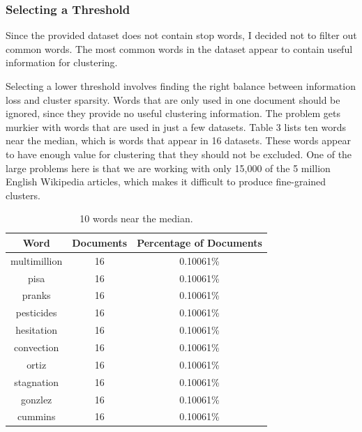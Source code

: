 \documentclass{article} %
\begin{document}
\subsubsection{Selecting a Threshold}

Since the provided dataset does not contain stop words, I decided not to filter out common words. The most common words in the dataset appear to contain useful information for clustering. 

Selecting a lower threshold involves finding the right balance between information loss and cluster sparsity. Words that are only used in one document should be ignored, since they provide no useful clustering information. The problem gets murkier with words that are used in just a few datasets. Table 3 lists ten words near the median, which is words that appear in 16 datasets. These words appear to have enough value for clustering that they should not be excluded. One of the large problems here is that we are working with only 15,000 of the 5 million English Wikipedia articles, which makes it difficult to produce fine-grained clusters. 


\begin{table}[t]
\caption{10 words near the median.}
\label{median-common-words-table}
\begin{center}
    \begin{tabular}{ | c | c | c |}
    \hline
    \textbf{Word} & \textbf{Documents} & \textbf{Percentage of Documents} \\ \hline

multimillion & 16 & 0.10061\% \\ \hline 
pisa & 16 & 0.10061\% \\ \hline 
pranks & 16 & 0.10061\% \\ \hline 
pesticides & 16 & 0.10061\% \\ \hline 
hesitation & 16 & 0.10061\% \\ \hline 
convection & 16 & 0.10061\% \\ \hline 
ortiz & 16 & 0.10061\% \\ \hline 
stagnation & 16 & 0.10061\% \\ \hline 
gonzlez & 16 & 0.10061\% \\ \hline 
cummins & 16 & 0.10061\% \\ \hline 

\end{tabular}
\end{center}
\end{table}
\end{document}
